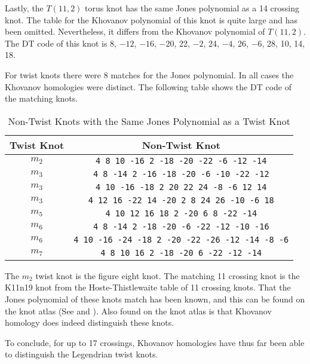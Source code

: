 \documentclass{article}
\theoremstyle{plain}
\begin{document}
        Lastly, the $T(11,2)$ torus knot has the same Jones polynomial as a
        14 crossing knot. The table for the Khovanov polynomial of this knot
        is quite large and has been omitted. Nevertheless, it differs from the
        Khovanov polynomial of $T(11,2)$. The DT code of this knot is
        8, $-12$, $-16$, $-20$, 22, $-2$, 24, $-4$, 26, $-6$, 28, 10, 14, 18.
        \par\hfill\par
        For twist knots there were 8 matches for the Jones polynomial. In all
        cases the Khovanov homologies were distinct. The following table shows
        the DT code of the matching knots.
        \begin{table}[H]
            \centering
            \begin{tabular}{| c | c |}
                \hline
                Twist Knot&Non-Twist Knot\\
                \hline
                $m_{2}$&\texttt{4 8 10 -16 2 -18 -20 -22 -6 -12 -14}\\
                \hline
                $m_{3}$&\texttt{4 8 -14 2 -16 -18 -20 -6 -10 -22 -12}\\
                \hline
                $m_{3}$&\texttt{4 10 -16 -18 2 20 22 24 -8 -6 12 14}\\
                \hline
                $m_{3}$&\texttt{4 12 16 -22 14 -20 2 8 24 26 -10 -6 18}\\
                \hline
                $m_{5}$&\texttt{4 10 12 16 18 2 -20 6 8 -22 -14}\\
                \hline
                $m_{6}$&\texttt{4 8 -14 2 -18 -20 -6 -22 -12 -10 -16}\\
                \hline
                $m_{6}$&\texttt{4 10 -16 -24 -18 2 -20 -22 -26 -12 -14 -8 -6}\\
                \hline
                $m_{7}$&\texttt{4 8 10 16 2 -18 -20 6 -22 -12 -14}\\
                \hline
            \end{tabular}
            \caption{Non-Twist Knots with the Same Jones Polynomial as a Twist Knot}
        \end{table}
        The $m_{2}$ twist knot is the figure eight knot. The matching 11
        crossing knot is the K11n19 knot from the
        Hoste-Thistlewaite table of 11 crossing knots. That the Jones polynomial
        of these knots match has been known, and this can be found on the
        knot atlas (See \cite{KatlasFigureEight} and \cite{KatlasK11n19}). Also
        found on the knot atlas is that Khovanov homology does indeed
        distinguish these knots.
        \par\hfill\par
        To conclude, for up to 17 crossings, Khovanov homologies
        have thus far been able to distinguish the Legendrian twist knots.
\end{document}
